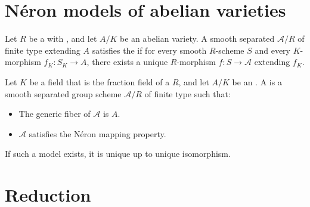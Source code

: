 \section{N\'eron models of abelian varieties}


\begin{definition}
Let $R$ be a  with , and let $A/K$ be an abelian variety.  
A smooth separated  $\mathcal{A}/R$ of finite type extending $A$ satisfies the  if for every smooth $R$-scheme $S$ and every $K$-morphism $f_K: S_K \to A$, there exists a unique $R$-morphism $f: S \to \mathcal{A}$ extending $f_K$.
\end{definition}

\begin{definition}
Let $K$ be a field that is the fraction field of a  $R$, and let $A/K$ be an .  
A  is a smooth separated group scheme $\mathcal{A}/R$ of finite type such that:
\begin{itemize}
    \item The generic fiber of $\mathcal{A}$ is $A$.
    \item $\mathcal{A}$ satisfies the Néron mapping property.
\end{itemize}

If such a model exists, it is unique up to unique isomorphism.
\end{definition}


\section{Reduction}





